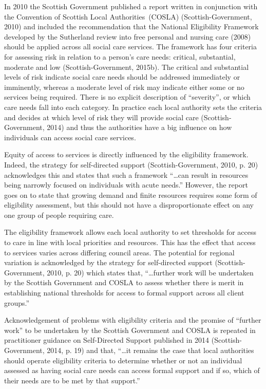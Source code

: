 \documentclass[12pt,a4paper,oneside,table]{report}
\begin{document}
In 2010 the Scottish Government published a report written in
conjunction with the Convention of Scottish Local Authorities~(COSLA)
(Scottish-Government, 2010) and included the recommendation that the
National Eligibility Framework developed by the Sutherland review into
free personal and nursing care (2008) should be applied across all
social care services. The framework has four criteria for assessing risk
in relation to a person's care needs: critical, substantial, moderate
and low (Scottish-Government, 2015b). The critical and substantial
levels of risk indicate social care needs should be addressed
immediately or imminently, whereas a moderate level of risk may indicate
either some or no services being required. There is no explicit
description of ``severity'', or which care needs fall into each
category. In practice each local authority sets the criteria and decides
at which level of risk they will provide social care
(Scottish-Government, 2014) and thus the authorities have a big
influence on how individuals can access social care services.

Equity of access to services is directly influenced by the eligibility
framework. Indeed, the strategy for self-directed support
(Scottish-Government, 2010, p. 20) acknowledges this and states that
such a framework ``\ldots can result in resources being narrowly focused
on individuals with acute needs.'' However, the report goes on to state
that growing demand and finite resources requires some form of
eligibility assessment, but this should not have a disproportionate
effect on any one group of people requiring care.

The eligibility framework allows each local authority to set thresholds
for access to care in line with local priorities and resources. This has
the effect that access to services varies across differing council
areas. The potential for regional variation is acknowledged by the
strategy for self-directed support (Scottish-Government, 2010, p. 20)
which states that, ``\ldots further work will be undertaken by the
Scottish Government and COSLA to assess whether there is merit in
establishing national thresholds for access to formal support across all
client groups.''

Acknowledgement of problems with eligibility criteria and the promise of
``further work'' to be undertaken by the Scottish Government and COSLA
is repeated in practitioner guidance on Self-Directed Support published
in 2014 (Scottish-Government, 2014, p. 19) and that, ``\ldots it remains
the case that local authorities should operate eligibility criteria to
determine whether or not an individual assessed as having social care
needs can access formal support and if so, which of their needs are to
be met by that support.''
\end{document}
